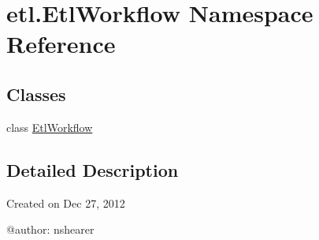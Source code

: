 \hypertarget{namespaceetl_1_1EtlWorkflow}{\section{etl.\-Etl\-Workflow Namespace Reference}
\label{namespaceetl_1_1EtlWorkflow}
}
\subsection*{Classes}
\begin{DoxyCompactItemize}
\item 
class \hyperlink{classetl_1_1EtlWorkflow_1_1EtlWorkflow}{Etl\-Workflow}
\end{DoxyCompactItemize}


\subsection{Detailed Description}
\begin{DoxyVerb}Created on Dec 27, 2012

@author: nshearer
\end{DoxyVerb}
 